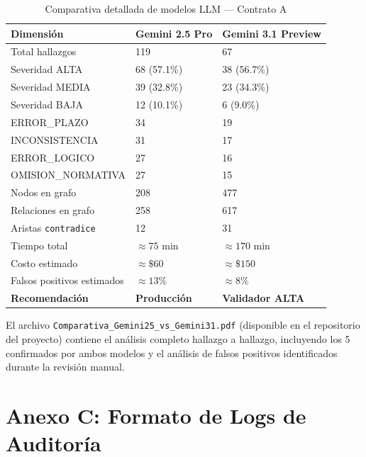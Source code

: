 \begin{table}[H]
\centering
\caption{Comparativa detallada de modelos LLM — Contrato A}
\label{tab:comparativa_modelos_anexo}
\begin{tabular}{p{4.5cm} p{3.5cm} p{3.5cm}}
\toprule
\textbf{Dimensión} & \textbf{Gemini 2.5 Pro} & \textbf{Gemini 3.1 Preview} \\
\midrule
Total hallazgos             & 119               & 67 \\
Severidad ALTA              & 68 (57.1\%)       & 38 (56.7\%) \\
Severidad MEDIA             & 39 (32.8\%)       & 23 (34.3\%) \\
Severidad BAJA              & 12 (10.1\%)       & 6 (9.0\%) \\
ERROR\_PLAZO                & 34                & 19 \\
INCONSISTENCIA              & 31                & 17 \\
ERROR\_LOGICO               & 27                & 16 \\
OMISION\_NORMATIVA          & 27                & 15 \\
Nodos en grafo              & 208               & 477 \\
Relaciones en grafo         & 258               & 617 \\
Aristas \texttt{contradice} & 12                & 31 \\
Tiempo total                & $\approx 75$ min  & $\approx 170$ min \\
Costo estimado              & $\approx \$60$    & $\approx \$150$ \\
Falsos positivos estimados  & $\approx 13\%$    & $\approx 8\%$ \\
\textbf{Recomendación}      & \textbf{Producción} & \textbf{Validador ALTA} \\
\bottomrule
\end{tabular}
\end{table}

El archivo \texttt{Comparativa\_Gemini25\_vs\_Gemini31.pdf} (disponible en el
repositorio del proyecto) contiene el análisis completo hallazgo a hallazgo,
incluyendo los 5 confirmados por ambos modelos y el análisis de falsos positivos
identificados durante la revisión manual.

\section*{Anexo C: Formato de Logs de Auditoría}

